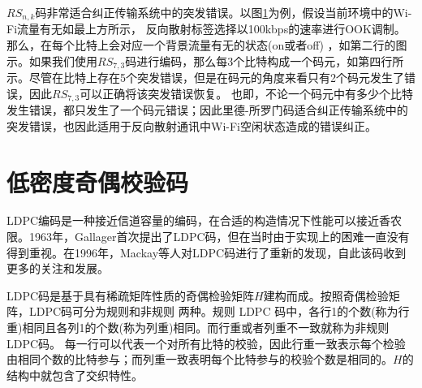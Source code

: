 $RS_{n,k}$码非常适合纠正传输系统中的突发错误。以图\ref{}为例，假设当前环境中的Wi-Fi流量有无如最上方所示，
反向散射标签选择以100kbps的速率进行OOK调制。那么，在每个比特上会对应一个背景流量有无的状态(on或者off)
，如第二行的图示。如果我们使用$RS_{7,3}$码进行编码，那么每3个比特构成一个码元，如第四行所示。尽管在比特上存在5个突发错误，但是在码元的角度来看只有2个码元发生了错误，因此$RS_{7,3}$可以正确将该突发错误恢复。
也即，不论一个码元中有多少个比特发生错误，都只发生了一个码元错误；因此里德-所罗门码适合纠正传输系统中的突发错误，也因此适用于反向散射通讯中Wi-Fi空闲状态造成的错误纠正。
\section{低密度奇偶校验码}

LDPC编码是一种接近信道容量的编码，在合适的构造情况下性能可以接近香农限。1963年，Gallager首次提出了LDPC码，但在当时由于实现上的困难一直没有得到重视。在1996年，Mackay等人对LDPC码进行了重新的发现，自此该码收到更多的关注和发展。

LDPC码是基于具有稀疏矩阵性质的奇偶检验矩阵$H$建构而成。按照奇偶检验矩阵，LDPC码可分为规则和非规则
两种。规则 LDPC 码中，各行1的个数(称为行重)相同且各列1的个数(称为列重)相同。而行重或者列重不一致就称为非规则LDPC码。
每一行可以代表一个对所有比特的校验，因此行重一致表示每个检验由相同个数的比特参与；而列重一致表明每个比特参与的校验个数是相同的。$H$的结构中就包含了交织特性。
